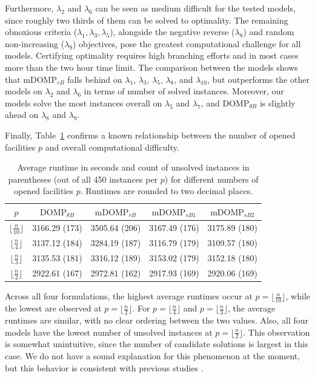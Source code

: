 \documentclass[letterpaper]{article}
\begin{document}
Furthermore, $\lambda_2$ and $\lambda_6$ can be seen as medium difficult for the tested models, since roughly two thirds of them can be solved to optimality. The remaining obnoxious criteria ($\lambda_1, \lambda_3, \lambda_5$), alongside the negative reverse ($\lambda_8$) and random non-increasing ($\lambda_9$) objectives, pose the greatest computational challenge for all models. Certifying optimality requires high branching efforts and in most cases more than the two hour time limit. The comparison between the models shows that $\text{mDOMP}_{rB}$ falls behind on $\lambda_1$, $\lambda_3$, $\lambda_5$, $\lambda_8$, and $\lambda_{10}$, but outperforms the other models on $\lambda_2$ and $\lambda_6$ in terms of number of solved instances. Moreover, our models solve the most instances overall on $\lambda_5$ and $\lambda_7$, and $\text{DOMP}_{\theta B}$ is slightly ahead on $\lambda_8$ and $\lambda_9$.

Finally, Table~\ref{tab:runtime_by_p} confirms a known relationship between the number of opened facilities $p$ and overall computational difficulty.
\begin{table}[ht]
    \centering
    \begin{tabular}{ccccc}
        \hline
        $p$ & $\text{DOMP}_{\theta B}$ & $\text{mDOMP}_{rB}$ & $\text{mDOMP}_{sB1}$ & $\text{mDOMP}_{sB2}$ \\
        \hline
        $\lfloor \frac{n}{10} \rfloor$ & 3166.29 (173) & 3505.64 (206) & 3167.49 (176) & 3175.89 (180) \\
        $\lfloor \frac{n}{4} \rfloor$ & 3137.12 (184) & 3284.19 (187) & 3116.79 (179) & 3109.57 (180) \\
        $\lfloor \frac{n}{3} \rfloor$ & 3135.53 (181) & 3316.12 (189) & 3153.02 (179) & 3152.18 (180) \\
        $\lfloor \frac{n}{2} \rfloor$ & 2922.61 (167) & 2972.81 (162) & 2917.93 (169) & 2920.06 (169) \\
        \hline
    \end{tabular}
    \caption{Average runtime in seconds and count of unsolved instances in parentheses (out of all 450 instances per $p$) for different numbers of opened facilities $p$. Runtimes are rounded to two decimal places.}
    \label{tab:runtime_by_p}
\end{table}
Across all four formulations, the highest average runtimes occur at $p = \lfloor \frac{n}{10} \rfloor$, while the lowest are observed at $p = \lfloor \frac{n}{2} \rfloor$. For $p = \lfloor \frac{n}{4} \rfloor$ and $p = \lfloor \frac{n}{3} \rfloor$, the average runtimes are similar, with no clear ordering between the two values. Also, all four models have the lowest number of unsolved instances at $p = \lfloor \frac{n}{2} \rfloor$. This observation is somewhat unintuitive, since the number of candidate solutions is largest in this case. We do not have a sound explanation for this phenomenon at the moment, but this behavior is consistent with previous studies \citep{labbe_comparative_2017, marin_fresh_2020, ljubic_benders_2024}.
\end{document}
